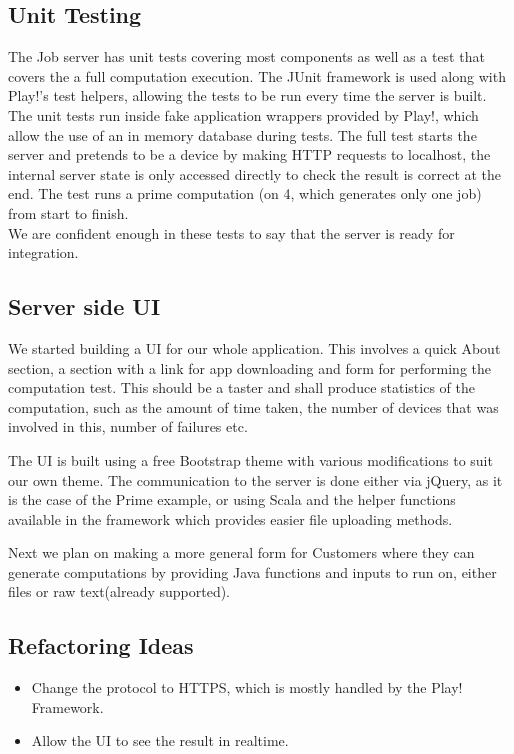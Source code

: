 \documentclass[a4paper,10pt]{article}
\begin{document}
\subsection{Unit Testing}

The Job server has unit tests covering most components as well as a test that covers the a full computation execution.
The JUnit framework is used along with Play!'s test helpers, allowing the tests to be run every time the server is built.\\
The unit tests run inside fake application wrappers provided by Play!, which allow the use of an in memory database during tests.
The full test starts the server and pretends to be a device by making HTTP requests to localhost,
the internal server state is only accessed directly to check the result is correct at the end.
The test runs a prime computation (on 4, which generates only one job) from start to finish.\\

We are confident enough in these tests to say that the server is ready for integration.

\subsection{Server side UI}
We started building a UI for our whole application. This involves a quick About section, a section with a link for app downloading and form for performing the computation test. This should be a taster and shall produce statistics of the computation, such as the amount of time taken, the number of devices that was involved in this, number of failures etc. 

The UI is built using a free Bootstrap theme with various modifications to suit our own theme. The communication to the server is done either via jQuery, as it is the case of the Prime example, or using Scala and the helper functions available in the framework which provides easier file uploading methods. 

Next we plan on making a more general form for Customers where they can generate computations by providing Java functions and inputs to run on, either files or raw text(already supported).

\subsection{Refactoring Ideas}

\begin{itemize}
\item Change the protocol to HTTPS, which is mostly handled by the Play! Framework.
\item Allow the UI to see the result in realtime.
\end{itemize}
\end{document}
